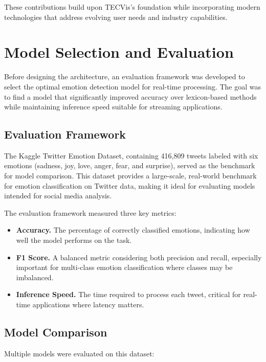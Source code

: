 These contributions build upon TECVis's foundation while incorporating modern technologies that address evolving user needs and industry capabilities.
 

\section{Model Selection and Evaluation}

Before designing the architecture, an evaluation framework was developed to select the optimal emotion detection model for real-time processing. The goal was to find a model that significantly improved accuracy over lexicon-based methods while maintaining inference speed suitable for streaming applications.

\subsection{Evaluation Framework}

The Kaggle Twitter Emotion Dataset, containing 416,809 tweets labeled with six emotions (sadness, joy, love, anger, fear, and surprise), served as the benchmark for model comparison. This dataset provides a large-scale, real-world benchmark for emotion classification on Twitter data, making it ideal for evaluating models intended for social media analysis.

The evaluation framework measured three key metrics:
\begin{itemize}
\item \textbf{Accuracy.} The percentage of correctly classified emotions, indicating how well the model performs on the task.
\item \textbf{F1 Score.} A balanced metric considering both precision and recall, especially important for multi-class emotion classification where classes may be imbalanced.
\item \textbf{Inference Speed.} The time required to process each tweet, critical for real-time applications where latency matters.
\end{itemize}

\subsection{Model Comparison}

Multiple models were evaluated on this dataset:

